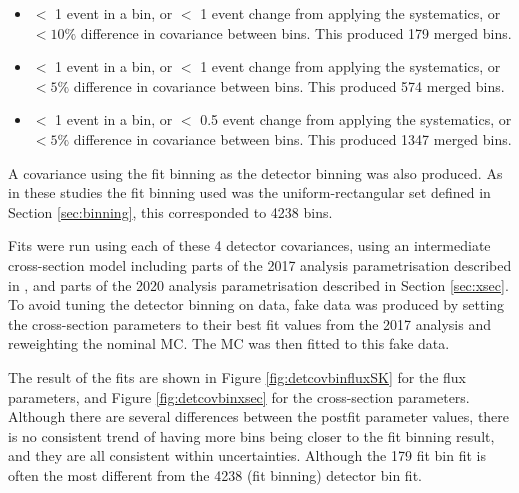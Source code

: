 \begin{itemize}

\item $<$ 1 event in a bin, or $<$ 1 event change from applying the systematics, or $< 10\%$ difference in covariance between bins. This produced 179 merged bins.

\item $<$ 1 event in a bin, or $<$ 1 event change from applying the systematics, or $< 5\%$ difference in covariance between bins. This produced 574 merged bins.

\item $<$ 1 event in a bin, or $<$ 0.5 event change from applying the systematics, or $< 5\%$ difference in covariance between bins. This produced 1347 merged bins.

\end{itemize}

A covariance using the fit binning as the detector binning was also produced. As in these studies the fit binning used was the uniform-rectangular set defined in Section \ref{sec:binning}, this corresponded to 4238 bins.

Fits were run using each of these 4 detector covariances, using an intermediate cross-section model including parts of the 2017 analysis parametrisation described in \cite{tn315}, and parts of the 2020 analysis parametrisation described in Section \ref{sec:xsec}. To avoid tuning the detector binning on data, fake data was produced by setting the cross-section parameters to their best fit values from the 2017 analysis and reweighting the nominal MC. The MC was then fitted to this fake data.

The result of the fits are shown in Figure \ref{fig:detcovbinfluxSK} for the flux parameters, and Figure \ref{fig:detcovbinxsec} for the cross-section parameters. Although there are several differences between the postfit parameter values, there is no consistent trend of having more bins being closer to the fit binning result, and they are all consistent within uncertainties. Although the 179 fit bin fit is often the most different from the 4238 (fit binning) detector bin fit.

